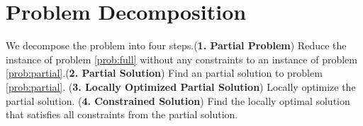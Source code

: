\section{Problem Decomposition}

We decompose the problem into four steps.(\textbf{1. Partial Problem}) Reduce the instance of problem \ref{prob:full} without any constraints to an instance of problem \ref{prob:partial}.(\textbf{2. Partial Solution}) Find an partial solution to problem \ref{prob:partial}. (\textbf{3. Locally Optimized Partial Solution}) Locally optimize the partial solution. (\textbf{4. Constrained Solution}) Find the locally optimal solution that satisfies all constraints from the partial solution.
